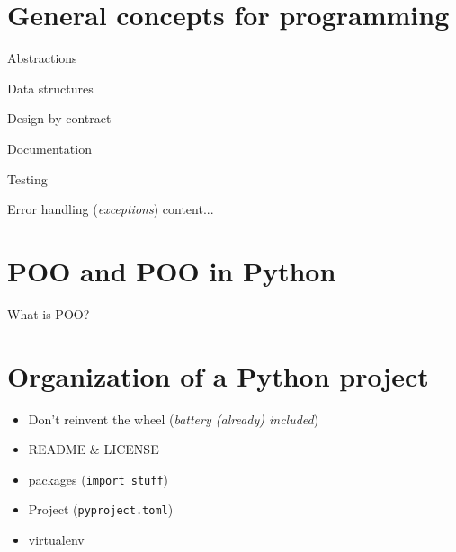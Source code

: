 \documentclass[10pt,
]{beamer}
\begin{document}
\section{General concepts for programming}

\begin{frame}{Abstractions}
\end{frame}

\begin{frame}{Data structures}
\end{frame}

\begin{frame}{Design by contract}
\end{frame}

\begin{frame}{Documentation}
\end{frame}

\begin{frame}{Testing}
\end{frame}

\begin{frame}{Error handling (\textit{exceptions})}
	content...
\end{frame}

 \section{POO and POO in Python}
 
 \begin{frame}{What is POO?}
 \end{frame}
 
 \section{Organization of a Python project}
 
 \begin{frame}
 	\begin{itemize}
 		\item Don't reinvent the wheel (\textit{battery (already) included})
 		\item README \& LICENSE
 		\item packages (\texttt{import stuff})
 		\item Project (\texttt{pyproject.toml})
 		\item virtualenv
 	\end{itemize}
 \end{frame}
\end{document}

